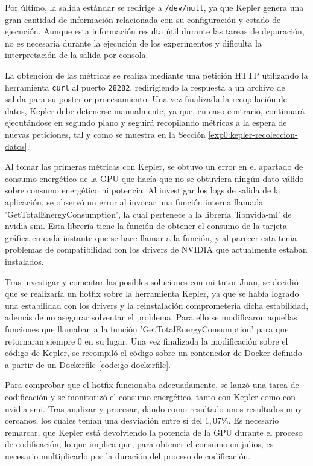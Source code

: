  Por último, la salida estándar se redirige a \texttt{/dev/null}, ya que Kepler genera una gran cantidad de información relacionada con su configuración y estado de ejecución. Aunque esta información resulta útil durante las tareas de depuración, no es necesaria durante la ejecución de los experimentos y dificulta la interpretación de la salida por consola.

 La obtención de las métricas se realiza mediante una petición HTTP utilizando la herramienta \texttt{curl} al puerto \texttt{28282}, redirigiendo la respuesta a un archivo de salida para su posterior procesamiento. Una vez finalizada la recopilación de datos, Kepler debe detenerse manualmente, ya que, en caso contrario, continuará ejecutándose en segundo plano y seguirá recopilando métricas a la espera de nuevas peticiones, tal y como se muestra en la Sección \ref{exp0:kepler-recoleccion-datos}.

 Al tomar las primeras métricas con Kepler, se obtuvo un error en el apartado de consumo energético de la GPU que hacía que no se obtuviera ningún dato válido sobre consumo energético ni potencia. Al investigar los logs de salida de la aplicación, se observó un error al invocar una función interna llamada 'GetTotalEnergyConsumption', la cual pertenece a la librería 'libnvida-ml' de nvidia-smi. Esta librería tiene la función de obtener el consumo de la tarjeta gráfica en cada instante que se hace llamar a la función, y al parecer esta tenía problemas de compatibilidad con los drivers de NVIDIA que actualmente estaban instalados.

 Tras investigar y comentar las posibles soluciones con mi tutor Juan, se decidió que se realizaría un hotfix sobre la herramienta Kepler, ya que se había logrado una estabilidad con los drivers y la reinstalación comprometería dicha estabilidad, además de no asegurar solventar el problema. Para ello se modificaron aquellas funciones que llamaban a la función 'GetTotalEnergyConsumption' para que retornaran siempre 0 en su lugar. Una vez finalizada la modificación sobre el código de Kepler, se recompiló el código sobre un contenedor de Docker definido a partir de un Dockerfile \ref{code:go-dockerfile}.

  

  Para comprobar que el hotfix funcionaba adecuadamente, se lanzó una tarea de codificación y se monitorizó el consumo energético, tanto con Kepler como con nvidia-smi. Tras analizar y procesar, dando como resultado unos resultados muy cercanos, los cuales tenían una desviación entre sí del $1,07\%$. Es necesario remarcar, que Kepler está devolviendo la potencia de la GPU durante el proceso de codificación, lo que implica que, para obtener el consumo en julios, es necesario multiplicarlo por la duración del proceso de codificación.

